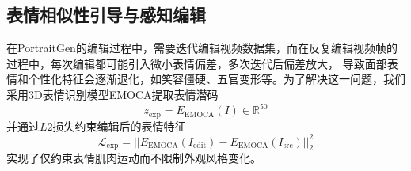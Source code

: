\subsection{表情相似性引导与感知编辑}

在PortraitGen的编辑过程中，需要迭代编辑视频数据集，而在反复编辑视频帧的过程中，每次编辑都可能引入微小表情偏差，多次迭代后偏差放大，
导致面部表情和个性化特征会逐渐退化，如笑容僵硬、五官变形等。为了解决这一问题，我们采用3D表情识别模型EMOCA提取表情潜码
\begin{equation}
    z_{\text{exp}}=E_{\text{EMOCA}}(I) \in \mathbb{R} ^{50}
\end{equation}
并通过$L2$损失约束编辑后的表情特征
\begin{equation}
    \mathcal{L}_{\text{exp}}=||E_{\text{EMOCA}}(I_{\text{edit}})-E_{\text{EMOCA}}(I_{\text{src}})||_2^2
\end{equation}
实现了仅约束表情肌肉运动而不限制外观风格变化。

